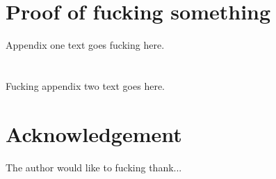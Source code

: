 \documentclass[journal,transmag]{IEEEtran}
\begin{document}
\newpage

\appendices
\section{Proof of fucking something}
	Appendix one text goes fucking here.

\section{}
	Fucking appendix two text goes here.

\section*{Acknowledgement}
	The author would like to fucking thank...



\end{document}

